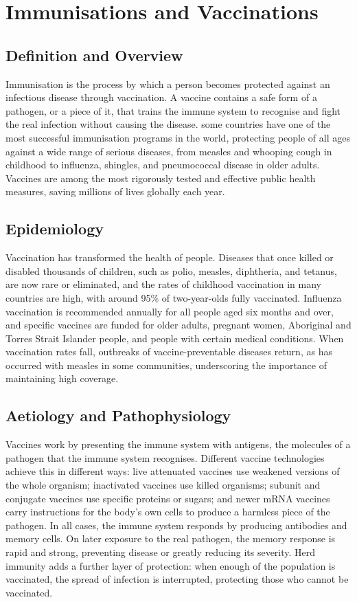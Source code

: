 \chapter{Immunisations and Vaccinations}

\section*{Definition and Overview}
Immunisation is the process by which a person becomes protected against an infectious disease through vaccination. A vaccine contains a safe form of a pathogen, or a piece of it, that trains the immune system to recognise and fight the real infection without causing the disease. some countries have one of the most successful immunisation programs in the world, protecting people of all ages against a wide range of serious diseases, from measles and whooping cough in childhood to influenza, shingles, and pneumococcal disease in older adults. Vaccines are among the most rigorously tested and effective public health measures, saving millions of lives globally each year.

\section*{Epidemiology}
Vaccination has transformed the health of people. Diseases that once killed or disabled thousands of children, such as polio, measles, diphtheria, and tetanus, are now rare or eliminated, and the rates of childhood vaccination in many countries are high, with around 95\% of two-year-olds fully vaccinated. Influenza vaccination is recommended annually for all people aged six months and over, and specific vaccines are funded for older adults, pregnant women, Aboriginal and Torres Strait Islander people, and people with certain medical conditions. When vaccination rates fall, outbreaks of vaccine-preventable diseases return, as has occurred with measles in some communities, underscoring the importance of maintaining high coverage.

\section*{Aetiology and Pathophysiology}
Vaccines work by presenting the immune system with antigens, the molecules of a pathogen that the immune system recognises. Different vaccine technologies achieve this in different ways: live attenuated vaccines use weakened versions of the whole organism; inactivated vaccines use killed organisms; subunit and conjugate vaccines use specific proteins or sugars; and newer mRNA vaccines carry instructions for the body's own cells to produce a harmless piece of the pathogen. In all cases, the immune system responds by producing antibodies and memory cells. On later exposure to the real pathogen, the memory response is rapid and strong, preventing disease or greatly reducing its severity. Herd immunity adds a further layer of protection: when enough of the population is vaccinated, the spread of infection is interrupted, protecting those who cannot be vaccinated.

